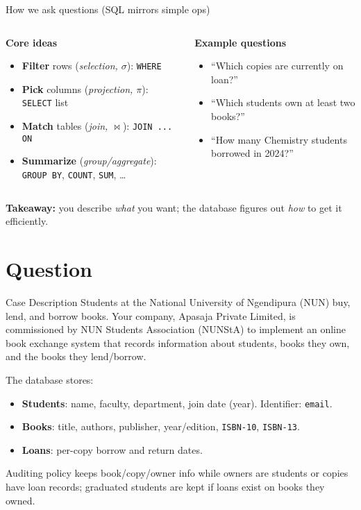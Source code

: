 \documentclass{beamer}
\begin{document}
\begin{frame}{How we ask questions (SQL mirrors simple ops)}
\begin{columns}[T,onlytextwidth]
\begin{column}{0.55\linewidth}
\textbf{Core ideas}
\begin{itemize}
  \item \textbf{Filter} rows (\emph{selection, $\sigma$}): \texttt{WHERE}
  \item \textbf{Pick} columns (\emph{projection, $\pi$}): \texttt{SELECT} list
  \item \textbf{Match} tables (\emph{join, $\bowtie$}): \texttt{JOIN ... ON}
  \item \textbf{Summarize} (\emph{group/aggregate}): \texttt{GROUP BY}, \texttt{COUNT}, \texttt{SUM}, \dots
\end{itemize}
\end{column}
\begin{column}{0.45\linewidth}
\textbf{Example questions}
\begin{itemize}
  \item “Which copies are currently on loan?”
  \item “Which students own at least two books?”
  \item “How many Chemistry students borrowed in 2024?”
\end{itemize}
\end{column}
\end{columns}
\vspace{0.6em}
\textbf{Takeaway:} you describe \emph{what} you want; the database figures out \emph{how} to get it efficiently.
\end{frame}

\section{Question}

\begin{frame}{Case Description}
Students at the National University of Ngendipura (NUN) buy, lend, and borrow books.
Your company, Apasaja Private Limited, is commissioned by NUN Students Association (NUNStA) to implement an online book exchange system that records information about students, books they own, and the books they lend/borrow.

The database stores:
\begin{itemize}
  \item \textbf{Students}: name, faculty, department, join date (year). Identifier: \texttt{email}.
  \item \textbf{Books}: title, authors, publisher, year/edition, \texttt{ISBN-10}, \texttt{ISBN-13}.
  \item \textbf{Loans}: per-copy borrow and return dates.
\end{itemize}
Auditing policy keeps book/copy/owner info while owners are students or copies have loan records;
graduated students are kept if loans exist on books they owned.
\end{frame}
\end{document}
